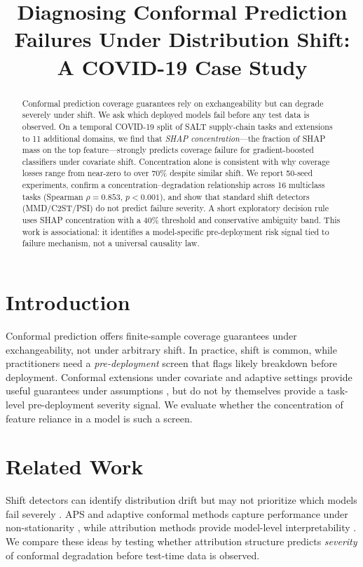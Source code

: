 \documentclass[sigconf,anonymous]{acmart}
\title{Diagnosing Conformal Prediction Failures Under Distribution Shift: A COVID-19 Case Study}
\begin{document}
\begin{abstract}
Conformal prediction coverage guarantees rely on exchangeability but can degrade severely under shift. We ask which deployed models fail before any test data is observed. On a temporal COVID-19 split of SALT supply-chain tasks and extensions to 11 additional domains, we find that \emph{SHAP concentration}---the fraction of SHAP mass on the top feature---strongly predicts coverage failure for gradient-boosted classifiers under covariate shift. Concentration alone is consistent with why coverage losses range from near-zero to over 70\% despite similar shift. We report 50-seed experiments, confirm a concentration--degradation relationship across 16 multiclass tasks (Spearman $\rho=0.853$, $p<0.001$), and show that standard shift detectors (MMD/C2ST/PSI) do not predict failure severity. A short exploratory decision rule uses SHAP concentration with a 40\% threshold and conservative ambiguity band. This work is associational: it identifies a model-specific pre-deployment risk signal tied to failure mechanism, not a universal causality law.
\end{abstract}


\setlength{\tabcolsep}{3pt}

\maketitle

\section{Introduction}
Conformal prediction offers finite-sample coverage guarantees under exchangeability, not under arbitrary shift.
In practice, shift is common, while practitioners need a \emph{pre-deployment} screen that flags likely breakdown before deployment.
Conformal extensions under covariate and adaptive settings provide useful guarantees under assumptions \citep{barber2023conformal,tibshirani2019conformal,zaffran2022adaptive},
but do not by themselves provide a task-level pre-deployment severity signal.
We evaluate whether the concentration of feature reliance in a model is such a screen.

\section{Related Work}
Shift detectors can identify distribution drift but may not prioritize which models fail severely \citep{koh2021wilds,malinin2021shifts,gulrajani2020search}.
APS and adaptive conformal methods capture performance under non-stationarity \citep{romano2020classification,gibbs2021adaptive}, while attribution methods provide model-level interpretability \citep{lundberg2017unified,lundberg2020local}.
We compare these ideas by testing whether attribution structure predicts \emph{severity} of conformal degradation before test-time data is observed.
\end{document}
